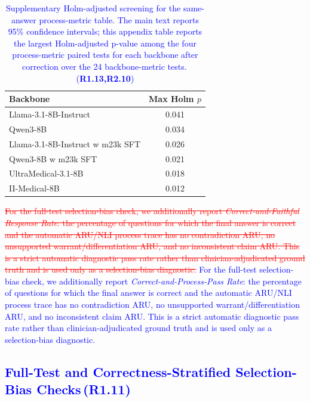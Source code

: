 \documentclass[a4paper,fleqn,doubleblind]{cas-sc}
\DeclareRobustCommand{\deleted}[1]{\textcolor{red}{\sout{#1}}}
\DeclareRobustCommand{\added}[1]{\textcolor{blue}{#1}}
\DeclareRobustCommand{\revtag}[1]{\textcolor{blue}{\scriptsize\,(\textbf{#1})}}
\begin{document}
\begin{table}[htbp]
    \centering
    \footnotesize
    \caption{\added{Supplementary Holm-adjusted screening for the same-answer process-metric table. The main text reports 95\% confidence intervals; this appendix table reports the largest Holm-adjusted p-value among the four process-metric paired tests for each backbone after correction over the 24 backbone-metric tests.}\revtag{R1.13,R2.10}}
    \label{tab:process_metric_holm_screening}
    \begingroup\color{blue}
    \begin{tabular}{lc}
        \toprule
        \textbf{Backbone} & \textbf{Max Holm $p$} \\
        \midrule
        Llama-3.1-8B-Instruct & 0.041 \\
        Qwen3-8B & 0.034 \\
        Llama-3.1-8B-Instruct w m23k SFT & 0.026 \\
        Qwen3-8B w m23k SFT & 0.021 \\
        UltraMedical-3.1-8B & 0.018 \\
        II-Medical-8B & 0.012 \\
        \bottomrule
    \end{tabular}
    \endgroup
\end{table}

\deleted{For the full-test selection-bias check, we additionally report \textit{Correct-and-Faithful Response Rate}: the percentage of questions for which the final answer is correct and the automatic ARU/NLI process trace has no contradiction ARU, no unsupported warrant/differentiation ARU, and no inconsistent claim ARU. This is a strict automatic diagnostic pass rate rather than clinician-adjudicated ground truth and is used only as a selection-bias diagnostic.}
\added{For the full-test selection-bias check, we additionally report \textit{Correct-and-Process-Pass Rate}: the percentage of questions for which the final answer is correct and the automatic ARU/NLI process trace has no contradiction ARU, no unsupported warrant/differentiation ARU, and no inconsistent claim ARU. This is a strict automatic diagnostic pass rate rather than clinician-adjudicated ground truth and is used only as a selection-bias diagnostic.}

\subsection{\added{Full-Test and Correctness-Stratified Selection-Bias Checks}\revtag{R1.11}}
\label{app:selection_bias_process}
\end{document}
